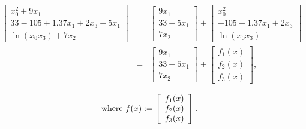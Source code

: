 \documentclass[11pt]{article}
\renewcommand{\_}{{\char"5F}}
\renewcommand{\{}{{\char"7B}}
\renewcommand{\}}{{\char"7D}}
\renewcommand{\^}{{\char"0D}}
\renewcommand{\'}{{\char"0D}}
\begin{document}
\begin{enumerate}[Step 1:]
\begin{eqnarray}
    \left[
        \begin{array}{r}
            x_0^2+9x_1 \\
            33 - 105 + 1.37x_1 + 2x_3 + 5x_1 \\
            \ln (x_0x_3) + 7x_2
        \end{array}
    \right]
&=&
    \left[
        \begin{array}{r}
            9x_1 \\
            33 + 5x_1 \\
            7x_2
        \end{array}
    \right]
+
    \left[
        \begin{array}{r}
            x_0^2 \\
            - 105 + 1.37x_1 + 2x_3  \\
            \ln (x_0x_3)
        \end{array}
    \right]
  \nonumber  \\
  &=&  \left[
        \begin{array}{r}
            9x_1 \\
            33 + 5x_1 \\
            7x_2
        \end{array}
    \right]
+
    \left[
        \begin{array}{r}
            f_1(x) \\
            f_2(x) \\
            f_3(x)
        \end{array}  \label{eq:definef1}
    \right],
\end{eqnarray}

\begin{eqnarray}
\hbox{\rm where}\ f(x) :=
%
    \left[
        \begin{array}{r}
            f_1(x) \\
            f_2(x) \\
            f_3(x)
        \end{array}   \label{eq:definef}
    \right].
\end{eqnarray}



\end{enumerate}
\end{document}
